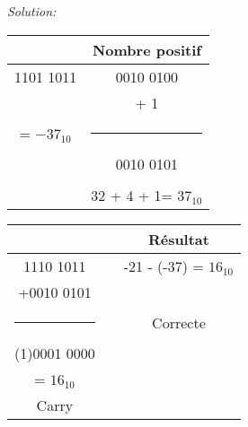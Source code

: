 \documentclass{article}
\newenvironment{solution}
    {\textit{Solution:}}
    {}
\begin{document}
\begin{solution}
\begin{itemize}
        \begin{tabular}{|c|c|}
        \hline
        & Nombre positif\\
        \hline    
        1101 1011                   &       0010 0100           \\
                                    &       + \hspace{25pt} 1   \\
        = $-37_{10}$  &       \rule{1in}{1pt}     \\
        \hspace{5pt}                &       0010 0101           \\
        \hspace{100pt}              &       \hspace{100pt}      \\
                                    &       32 + 4 + 1= $37_{10}$\\
        \hline
        \end{tabular}
        
        \hspace{40pt}
        
        \begin{tabular}{|c|c|c|}
        \hline
        &  & Résultat \\
        \hline
        \hspace{6pt}1110 1011       &                          &       -21 - (-37) = $16_{10}$         \\
        +0010 0101                  &        \hspace{25pt}            &                                         \\
        \rule{1in}{1pt}             &                  &       Correcte                          \\
        (1)0001 0000                &                          &                                         \\
        \hspace{33pt} = $16_{10}$ \hspace{30pt}  &       &                                   \\
        Carry                       &       \hspace{100pt}              &      \hspace{100pt}                     \\
        \hline
        \end{tabular}
        

\end{itemize}
\end{solution}
\end{document}
